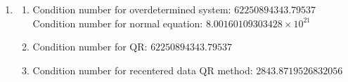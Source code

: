 \documentclass[10pt]{article}
\begin{document}
\begin{enumerate}[label=(\alph*)]
\begin{figure}[H]
    \end{figure}
    
    \item \begin{enumerate}
        \item Condition number for overdetermined system: $62250894343.79537$\\
        Condition number for normal equation: $8.00160109303428\times 10^{21}$\\
        \item Condition number for QR: $62250894343.79537$\\
        \item Condition number for recentered data QR method: $2843.8719526832056$
    \end{enumerate}
\end{enumerate}
\end{document}
